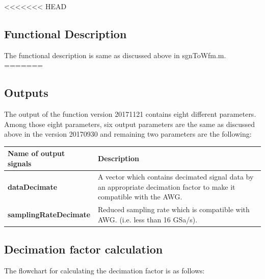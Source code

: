 <<<<<<< HEAD
\subsection*{Functional Description}
The functional description is same as discussed above in sgnToWfm.m.
=======
\subsection*{Outputs}
The output of the function version 20171121 contains eight different parameters. Among those eight parameters, six output parameters are the same as discussed above in the version 20170930 and remaining two parameters are the following:

\begin{center}
	\begin{tabular}{ |p{4.5cm}||p{10cm}|   }
		\hline
		\textbf{Name of output signals} & \textbf{Description}\\
		\hline
		\hline
		\centering \textbf{dataDecimate}	& A vector which contains decimated signal data by an appropriate decimation factor to make it compatible with the AWG.\\
		\hline
		\centering \textbf{samplingRateDecimate}	& Reduced sampling rate which is compatible with AWG. (i.e. less than 16 GSa/s).\\		
		\hline
	\end{tabular}
\end{center}
\newpage
\subsection*{Decimation factor calculation}
The flowchart for calculating the decimation factor is as follows:


